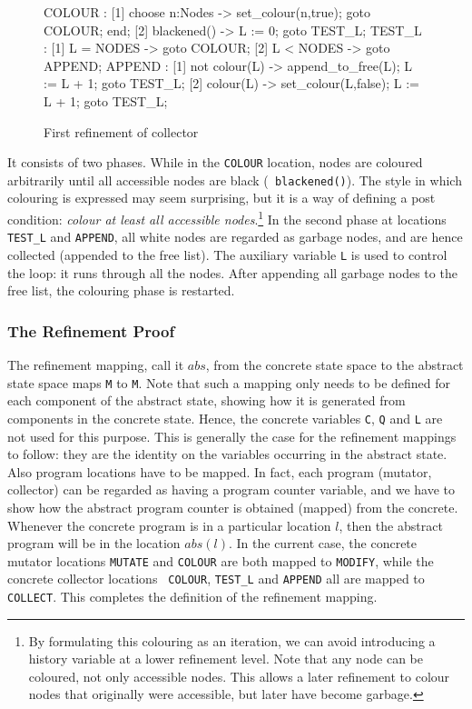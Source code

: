 \begin{figure}[htb]
\begin{smallsession}
  COLOUR :
    [1] choose n:Nodes -> 
          set_colour(n,true); 
          goto COLOUR;
        end;
    [2] blackened() -> L := 0; goto TEST_L;
  TEST_L :
    [1] L = NODES -> goto COLOUR;
    [2] L < NODES -> goto APPEND;
  APPEND :
    [1] not colour(L) -> append_to_free(L); L := L + 1; goto TEST_L;
    [2] colour(L) -> set_colour(L,false); L := L + 1; goto TEST_L; 
\end{smallsession}
\caption{First refinement of collector}
\label{refinement1-collector}
\end{figure}

It consists of two phases.  While  in the {\tt COLOUR} location, nodes
are coloured arbitrarily until  all  accessible nodes are black  ({\tt
  blackened()})\@.  The style in which colouring is expressed may seem
surprising, but it is a way of defining a  post condition: {\em colour
  at  least  all   accessible nodes}\@.\footnote{By  formulating  this
  colouring as    an iteration, we   can  avoid introducing  a history
  variable at a lower  refinement level.   Note  that any node can  be
  coloured, not only accessible  nodes. This allows a later refinement
  to colour nodes   that originally were  accessible,  but  later have
  become  garbage.}  In the  second phase at locations {\tt TEST\_L} and
{\tt APPEND},  all white nodes are  regarded as garbage nodes, and are
hence collected (appended to the free list)\@.  The auxiliary variable
{\tt L}  is used to  control the loop: it  runs through all the nodes. 
After  appending all  garbage  nodes to the  free  list, the colouring
phase is restarted.


\subsubsection{The Refinement Proof}
\label{first-informal-refinement}

The  refinement mapping, call it $abs$,  from the concrete state space
to the abstract state space maps {\tt M} to {\tt M}\@.  Note that such
a mapping only needs to be defined  for each component of the abstract
state,  showing how it  is generated  from  components in the concrete
state.  Hence, the concrete variables {\tt C}, {\tt Q} and {\tt L} are
not used  for this  purpose.   This is  generally  the case   for  the
refinement mappings to follow: they are  the identity on the variables
occurring  in the abstract state.  Also  program  locations have to be
mapped.  In fact, each program (mutator, collector) can be regarded as
having a program   counter  variable, and we    have to show  how  the
abstract program   counter is obtained  (mapped)  from  the  concrete. 
Whenever the  concrete program is in a  particular  location $l$, then
the abstract program will be in  the location $abs(l)$.   In the current case,
the concrete mutator locations {\tt  MUTATE} and {\tt COLOUR} are both
mapped to  {\tt MODIFY}, while  the  concrete collector locations {\tt
  COLOUR}, {\tt  TEST\_L}  and {\tt APPEND}   all are mapped   to {\tt
  COLLECT}\@. This completes the definition of the refinement mapping.

